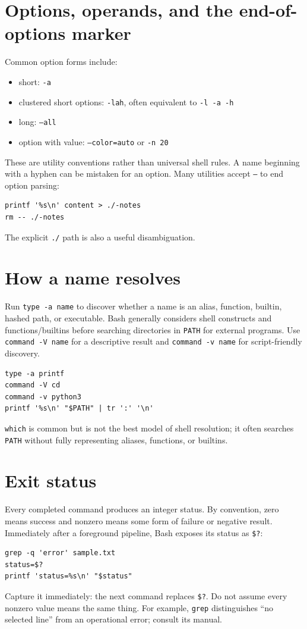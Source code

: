 \documentclass[11pt,oneside,openany]{book}
\begin{document}
\section{Options, operands, and the end-of-options marker}
Common option forms include:
\begin{itemize}
  \item short: \texttt{-a}
  \item clustered short options: \texttt{-lah}, often equivalent to \texttt{-l -a -h}
  \item long: \texttt{--all}
  \item option with value: \texttt{--color=auto} or \texttt{-n 20}
\end{itemize}
These are utility conventions rather than universal shell rules. A name beginning with a hyphen can be mistaken for an option. Many utilities accept \texttt{--} to end option parsing:
\begin{lstlisting}
printf '%s\n' content > ./-notes
rm -- ./-notes
\end{lstlisting}
The explicit \texttt{./} path is also a useful disambiguation.

\section{How a name resolves}
Run \texttt{type -a name} to discover whether a name is an alias, function, builtin, hashed path, or executable. Bash generally considers shell constructs and functions/builtins before searching directories in \texttt{PATH} for external programs. Use \texttt{command -V name} for a descriptive result and \texttt{command -v name} for script-friendly discovery.
\begin{lstlisting}
type -a printf
command -V cd
command -v python3
printf '%s\n' "$PATH" | tr ':' '\n'
\end{lstlisting}
\texttt{which} is common but is not the best model of shell resolution; it often searches \texttt{PATH} without fully representing aliases, functions, or builtins.

\section{Exit status}
Every completed command produces an integer status. By convention, zero means success and nonzero means some form of failure or negative result. Immediately after a foreground pipeline, Bash exposes its status as \texttt{\$?}:
\begin{lstlisting}
grep -q 'error' sample.txt
status=$?
printf 'status=%s\n' "$status"
\end{lstlisting}
Capture it immediately: the next command replaces \texttt{\$?}. Do not assume every nonzero value means the same thing. For example, \texttt{grep} distinguishes “no selected line” from an operational error; consult its manual.
\end{document}
